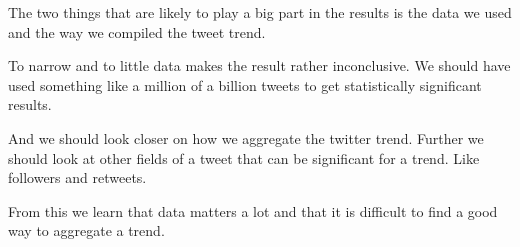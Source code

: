 The two things that are likely to play a big part in the results is the data we
used and the way we compiled the tweet trend. 

To narrow and to little data makes the result rather inconclusive. We should have
used something like a million of a billion tweets to get statistically
significant results.

And we should look closer on how we aggregate the twitter trend. Further we
should look at other fields of a tweet that can be significant for a trend. Like
followers and retweets.

From this we learn that data matters a lot and that it is difficult to find a
good way to aggregate a trend. 
%
